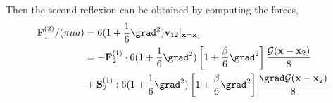 Then the second reflexion can be obtained by computing the forces, 
\begin{align}
    \textbf{F}^{(2)}_1/(\pi\mu a) 
    &= 6 (1 + \frac{1}{6}\grad^2) \textbf{v}_{12}|_{\textbf{x}=\textbf{x}_1}\\
    &= 
    - \textbf{F}_2^{(1)}\cdot 6 (1 + \frac{1}{6}\grad^2) \left[1+\frac{\beta}{6}\grad^2 \right]\frac{\mathcal{G}(\textbf{x}-\textbf{x}_2)}{8}\\
    &+ \textbf{S}_2^{(1)}:  6 (1 + \frac{1}{6}\grad^2) \left[1+\frac{\beta}{6}\grad^2 \right]\frac{\grad\mathcal{G}(\textbf{x}-\textbf{x}_2)}{8}\\
\end{align}
